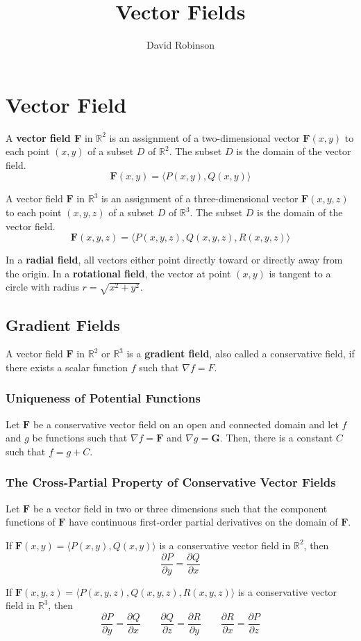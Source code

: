 \documentclass{article}
\title{Vector Fields}
\author{David Robinson}
\date{}
\begin{document}
\maketitle

\section*{Vector Field}

A \textbf{vector field F} in $\mathbb{R}^2$ is an assignment of a two-dimensional vector $\mathbf{F}(x,y)$ to each point $(x,y)$ of a subset $D$ of $\mathbb{R}^2$. The subset $D$ is the domain of the vector field.
\[\mathbf{F}(x,y)=\langle P(x,y), Q(x,y)\rangle\]

A vector field $\mathbf{F}$ in $\mathbb{R}^3$ is an assignment of a three-dimensional vector $\mathbf{F}(x,y,z)$ to each point $(x,y,z)$ of a subset $D$ of $\mathbb{R}^3$. The subset $D$ is the domain of the vector field.
\[\mathbf{F}(x,y,z)=\langle P(x,y,z), Q(x,y,z), R(x,y,z)\rangle\]

In a \textbf{radial field}, all vectors either point directly toward or directly away from the origin. In a \textbf{rotational field}, the vector at point $(x,y)$ is tangent to a circle with radius $r=\sqrt{x^2+y^2}$.



\subsection*{Gradient Fields}
A vector field $\mathbf{F}$ in $\mathbb{R}^2$ or $\mathbb{R}^3$ is a \textbf{gradient field}, also called a conservative field, if there exists a scalar function $f$ such that $\nabla f = F$.

\subsubsection*{Uniqueness of Potential Functions}
Let $\mathbf{F}$ be a conservative vector field on an open and connected domain and let $f$ and $g$ be functions such that $\nabla f=\mathbf{F}$ and $\nabla g=\mathbf{G}$. Then, there is a constant $C$ such that $f=g+C$.

\subsubsection*{The Cross-Partial Property of Conservative Vector Fields}
Let $\mathbf{F}$ be a vector field in two or three dimensions such that the component functions of $\mathbf{F}$ have continuous first-order partial derivatives on the domain of $\mathbf{F}$.
\vspace{1em}

If $\mathbf{F}(x,y)=\langle P(x,y),Q(x,y)\rangle$ is a conservative vector field in $\mathbb{R}^2$, then
\[\frac{\partial P}{\partial y}=\frac{\partial Q}{\partial x}\]

If $\mathbf{F}(x,y,z)=\langle P(x,y,z),Q(x,y,z),R(x,y,z)\rangle$ is a conservative vector field in $\mathbb{R}^3$, then
\[\frac{\partial P}{\partial y}=\frac{\partial Q}{\partial x}\quad\quad\frac{\partial Q}{\partial z}=\frac{\partial R}{\partial y}\quad\quad\frac{\partial R}{\partial x}=\frac{\partial P}{\partial z}\]
\end{document}
